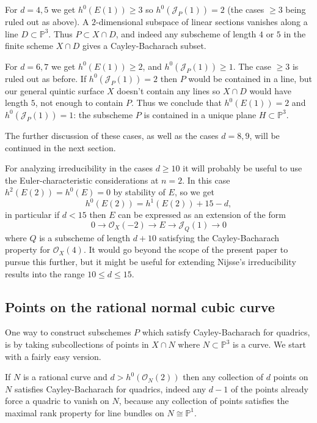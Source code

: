 \documentclass{amsart}
\theoremstyle{plain}
\numberwithin{equation}{section}
\begin{document}
For $d=4,5$ we get $h^0(E(1))\geq 3$ so 
$h^0({{\mathcal J}} _P (1))= 2$ (the cases $\geq 3$ being ruled out as above).
A $2$-dimensional subspace of linear sections
vanishes along a line $D\subset {{\mathbb P}} ^3$. Thus $P\subset X\cap D$, and indeed
any subscheme of length $4$ or $5$ in the finite scheme $X\cap D$ 
gives a Cayley-Bacharach subset. 

For $d=6,7$ we get $h^0(E(1))\geq 2$, and $h^0({{\mathcal J}} _P (1))\geq 1$. 
The case $\geq 3$ is ruled out as before. If $h^0({{\mathcal J}} _P (1))=2$ then
$P$ would be contained in a line, but our general quintic surface $X$ doesn't contain
any lines so $X\cap D$ would have length $5$, not enough to contain $P$. Thus
we conclude that $h^0(E(1))= 2$ and $h^0({{\mathcal J}} _P (1))=1$: the subscheme $P$ is contained
in a unique plane $H\subset {{\mathbb P}} ^3$. 

The further discussion of these cases, as well as the cases $d=8,9$,
will be continued in the next section. 

For analyzing irreducibility in the cases $d\geq  10$ it will probably be useful to use
the Euler-characteristic considerations at $n=2$. In this case $h^2(E(2))= h^0(E)=0$ by
stability of $E$, so we get
$$
h^0(E(2)) = h^1(E(2))+15-d,
$$
in particular if $d<15$ then $E$ can be expressed as an extension
of the form 
$$
0\rightarrow {{\mathcal O}} _X(-2)\rightarrow E \rightarrow {{\mathcal J}} _Q(1)\rightarrow 0
$$
where $Q$ is a subscheme of length $d+10$ satisfying
the Cayley-Bacharach property for ${{\mathcal O}} _X(4)$. It would go beyond the scope of the present
paper to pursue this further, but
it might be useful for extending Nijsse's irreducibility results into the 
range $10\leq d \leq 15$. 

\subsection{Points on the rational normal cubic curve}
\label{sec-rationalnormal}
 
One way to construct subschemes $P$ which satisfy Cayley-Bacharach for quadrics,
is by  taking subcollections of points in $X\cap N$ where $N\subset {{\mathbb P}} ^3$ is
a curve. We start with a fairly easy version. 

If $N$ is a rational curve and $d> h^0({{\mathcal O}} _N(2))$ then any
collection of $d$ points on $N$ satisfies Cayley-Bacharach for quadrics, indeed
any $d-1$ of the points already force a quadric to vanish on $N$, because
any collection of points satisfies the maximal rank property
for line bundles on $N\cong {{\mathbb P}} ^1$. 
\end{document}
